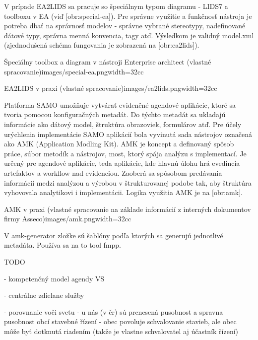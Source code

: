 V prípade EA2LIDS sa pracuje so špeciálnym typom diagramu - LIDS7 a toolboxu v EA (viď [obr:special-ea]). Pre správne využitie a funkčnosť nástroja je potreba dbať na správnosť modelov - správne vybrané stereotypy, nadefinované dátové typy, správna menná konvencia, tagy atď. Výsledkom je validný model.xml (zjednodušená schéma fungovania je zobrazená na [obr:ea2lids]).

{Špeciálny toolbox a diagram v nástroji Enterprise architect (vlastné spracovanie)}{images/special-ea.png}{width=32cc}

{EA2LIDS v praxi (vlastné spracovanie)}{images/ea2lids.png}{width=32cc}

Platforma SAMO umožňuje vytvárať evidenčné agendové aplikácie, ktoré sa tvoria pomocou konfiguračných metadát. Do týchto metadát sa ukladajú informácie ako dátový model, štruktúra obrazoviek, formulárov atď. Pre účely urýchlenia implementácie SAMO aplikácií bola vyvinutá sada nástrojov označená ako AMK (Application Modling Kit). AMK je koncept a definovaný spôsob práce, súbor metodík a nástrojov, most, ktorý spája analýzu s implementací. Je určený pre agendové aplikácie, teda aplikácie, kde hlavnú úlohu hrá evedincia artefaktov a workflow nad evidenciou. Zaoberá sa spôsobom predávania informácií medzi analýzou a výrobou v štrukturovanej podobe tak, aby štruktúra vyhovovala analytikovi i implementácii. Logika využitia AMK je na [obr:amk].

%

{AMK v praxi (vlastné spracovanie na základe informácií z interných dokumentov firmy Asseco)}{images/amk.png}{width=32cc}

V amk-generator zložke sú šablóny podľa ktorých sa generujú jednotlivé metadáta. Používa sa na to tool fmpp.


\TODO
TODO

- kompetenčný model agendy VS

- centrálne zdielane služby

- porovnanie voči svetu - u nás (v čr) sú prenesená pusobnost a spravna pusobnost obcí
stavebné řízení - obec povoluje schvalovanie stavieb, ale obec môže byť dotknutá riadením (takže je vlastne schvalovatel aj účastník řízení)

